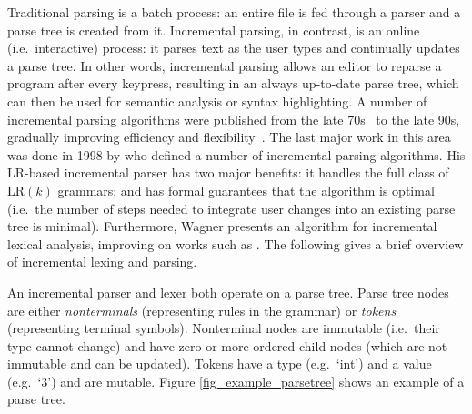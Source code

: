 \documentclass[sigplan,screen]{acmart}\settopmatter{printfolios=true,printccs=false,printacmref=false}
\begin{document}
Traditional parsing is a batch process: an entire file is fed through a parser
and a parse tree is created from it. Incremental parsing, in contrast, is an
online (i.e.~interactive) process: it parses text as the user types and
continually updates a parse tree.  In other words, incremental parsing allows
an editor to reparse a program after every keypress, resulting in an always
up-to-date parse tree, which can then be used for semantic analysis or syntax
highlighting.  A number of incremental parsing algorithms were published from
the late 70s~\cite{ghezzi79incremental, jalili82building, larcheveque95optimal,
petrone95reusing} to the late 90s, gradually improving efficiency and
flexibility~\cite{li97new,ferro94efficient}.  The last major work in this area
was done in 1998 by \cite{wagner98practicalalgorithms} who defined a number of
incremental parsing algorithms. His LR-based incremental parser has two major
benefits: it handles the full class of $\textrm{LR}(k)$ grammars; and has
formal guarantees that the algorithm is optimal (i.e.~the number of steps
needed to integrate user changes into an existing parse tree is minimal).
Furthermore, Wagner presents an algorithm for incremental lexical analysis,
improving on works such as \cite{fischer84poe, bahlke86psg, ballance92pan,
fischer92aladin}. The following gives a brief overview of incremental lexing
and parsing.

An incremental parser and lexer both operate on a parse tree. Parse tree nodes
are either \emph{nonterminals} (representing rules in the grammar) or
\emph{tokens} (representing terminal symbols). Nonterminal nodes are immutable
(i.e.~their type cannot change) and have zero or more ordered child nodes
(which are not immutable and can be updated). Tokens have a type (e.g.~`int')
and a value (e.g.~`3') and are mutable. Figure \ref{fig_example_parsetree}
shows an example of a parse tree.
\end{document}
